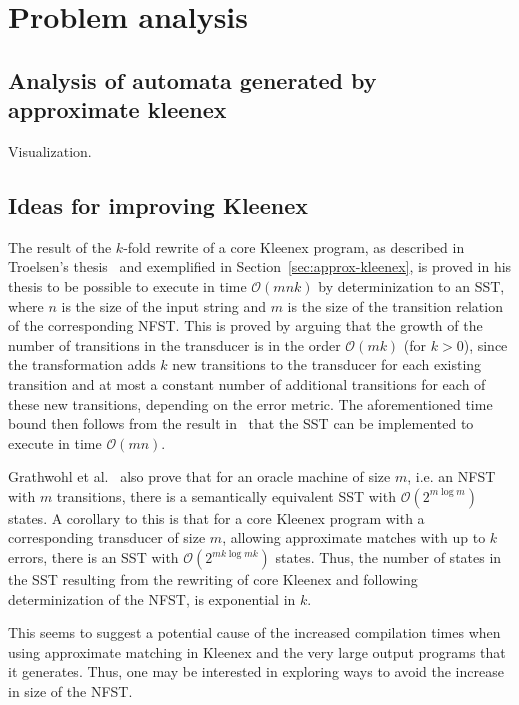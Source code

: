 \section{Problem analysis}

\subsection{Analysis of automata generated by approximate kleenex}

Visualization.

\subsection{Ideas for improving Kleenex}

The result of the $k$-fold rewrite of a core Kleenex program, as described in
Troelsen's thesis~\cite{troelsen2016approximate} and exemplified in
Section~\ref{sec:approx-kleenex}, is proved in his thesis to be possible to
execute in time $\mathcal{O}(mnk)$ by determinization to an SST, where $n$ is
the size of the input string and $m$ is the size of the transition relation of
the corresponding NFST. This is proved by arguing that the growth of the number
of transitions in the transducer is in the order $\mathcal{O}(mk)$ (for $k>0$),
since the transformation adds $k$ new transitions to the transducer for each
existing transition and at most a constant number of additional transitions for
each of these new transitions, depending on the error metric. The
aforementioned time bound then follows from the result
in~\cite{grathwohl2016kleenex} that the SST can be implemented to execute in
time $\mathcal{O}(mn)$.


Grathwohl et al.~\cite{grathwohl2016kleenex} also prove that for an oracle
machine of size $m$, i.e. an NFST with $m$ transitions, there is a semantically
equivalent SST with $\mathcal{O}(2^{m \log m})$ states. A corollary to this is
that for a core Kleenex program with a corresponding transducer of size $m$,
allowing approximate matches with up to $k$ errors, there is an SST with
$\mathcal{O}(2^{mk \log mk})$ states. Thus, the number of states in the SST
resulting from the rewriting of core Kleenex and following determinization of
the NFST, is exponential in $k$.

This seems to suggest a potential cause of the increased compilation times when
using approximate matching in Kleenex and the very large output programs that
it generates. Thus, one may be interested in exploring ways to avoid the
increase in size of the NFST.


